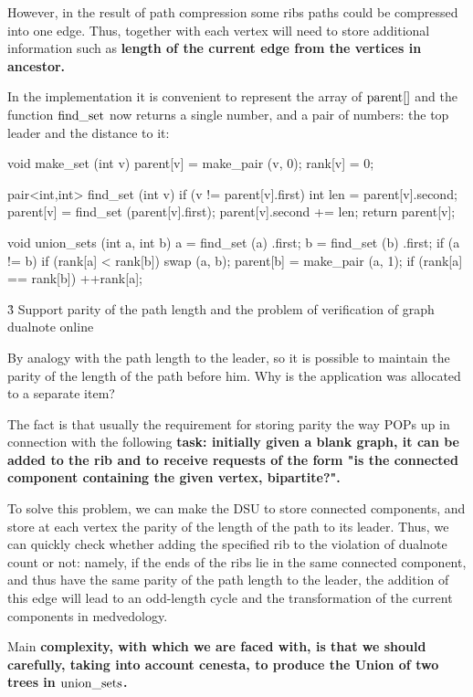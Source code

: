 However, in the result of path compression some ribs paths could be compressed into one edge. Thus, together with each vertex will need to store additional information such as \bf{length of the current edge from the vertices in ancestor}.

In the implementation it is convenient to represent the array of ${\rm parent}[]$ and the function $\rm find\_set$ now returns a single number, and a pair of numbers: the top leader and the distance to it:

\code
void make_set (int v) {
parent[v] = make_pair (v, 0);
rank[v] = 0;
}

pair<int,int> find_set (int v) {
if (v != parent[v].first) {
int len = parent[v].second;
parent[v] = find_set (parent[v].first);
parent[v].second += len;
}
return parent[v];
}

void union_sets (int a, int b) {
a = find_set (a) .first;
b = find_set (b) .first;
if (a != b) {
if (rank[a] < rank[b])
swap (a, b);
parent[b] = make_pair (a, 1);
if (rank[a] == rank[b])
++rank[a];
}
}
\endcode



\h3{ Support parity of the path length and the problem of verification of graph dualnote online }

By analogy with the path length to the leader, so it is possible to maintain the parity of the length of the path before him. Why is the application was allocated to a separate item?

The fact is that usually the requirement for storing parity the way POPs up in connection with the following \bf{task}: initially given a blank graph, it can be added to the rib and to receive requests of the form "is the connected component containing the given vertex, \bf{bipartite}?".

To solve this problem, we can make the DSU to store connected components, and store at each vertex the parity of the length of the path to its leader. Thus, we can quickly check whether adding the specified rib to the violation of dualnote count or not: namely, if the ends of the ribs lie in the same connected component, and thus have the same parity of the path length to the leader, the addition of this edge will lead to an odd-length cycle and the transformation of the current components in medvedology.

Main \bf{complexity}, with which we are faced with, is that we should carefully, taking into account cenesta, to produce the Union of two trees in $\rm union\_sets$.

